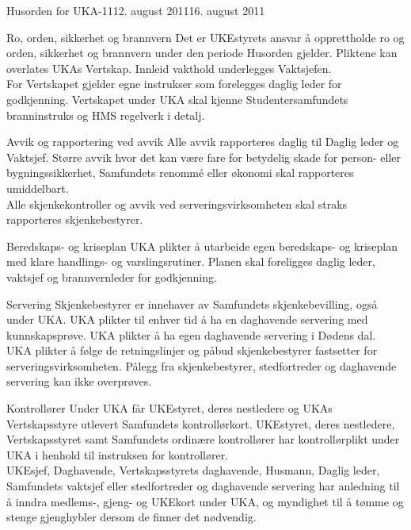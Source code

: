 \begin{instruks}{Husorden for UKA-11}{12. august 2011}{16. august 2011}
\begin{instruksledd}{Ro, orden, sikkerhet og brannvern}
Det er UKEstyrets ansvar å opprettholde ro og orden, sikkerhet og brannvern
under den periode Husorden gjelder. Pliktene kan overlates UKAs Vertskap.
Innleid vakthold underlegges Vaktsjefen.\\

For Vertskapet gjelder egne instrukser som forelegges daglig leder for
godkjenning. Vertskapet under UKA skal kjenne Studentersamfundets
branninstruks og HMS regelverk i detalj.
\end{instruksledd}

\begin{instruksledd}{Avvik og rapportering ved avvik}
Alle avvik rapporteres daglig til Daglig leder og Vaktsjef. Større avvik hvor det
kan være fare for betydelig skade for person- eller bygningssikkerhet,
Samfundets renommé eller økonomi skal rapporteres umiddelbart.\\

Alle skjenkekontroller og avvik ved serveringsvirksomheten skal straks
rapporteres skjenkebestyrer.
\end{instruksledd}

\begin{instruksledd}{Beredskaps- og kriseplan}
UKA plikter å utarbeide egen beredskaps- og kriseplan med klare handlings- og
varslingsrutiner. Planen skal foreligges daglig leder, vaktsjef og brannvernleder
for godkjenning.
\end{instruksledd}

\begin{instruksledd}{Servering}
Skjenkebestyrer er innehaver av Samfundets skjenkebevilling, også under UKA.
UKA plikter til enhver tid å ha en daghavende servering med kunnskapsprøve.
UKA plikter å ha egen daghavende servering i Dødens dal.\\

UKA plikter å følge de retningslinjer og påbud skjenkebestyrer fastsetter for
serveringsvirksomheten. Pålegg fra skjenkebestyrer, stedfortreder og
daghavende servering kan ikke overprøves.
\end{instruksledd}

\begin{instruksledd}{Kontrollører}
Under UKA får UKEstyret, deres nestledere og UKAs Vertskapsstyre utlevert
Samfundets kontrollørkort. UKEstyret, deres nestledere, Vertskapsstyret samt
Samfundets ordinære kontrollører har kontrollørplikt under UKA i henhold til
instruksen for kontrollører.\\

UKEsjef, Daghavende, Vertskapsstyrets daghavende, Husmann, Daglig leder,
Samfundets vaktsjef eller stedfortreder og daghavende servering har anledning
til å inndra medlems-, gjeng- og UKEkort under UKA, og myndighet til å tømme
og stenge gjenghybler dersom de finner det nødvendig.\\


\end{instruksledd}
\end{instruks}
